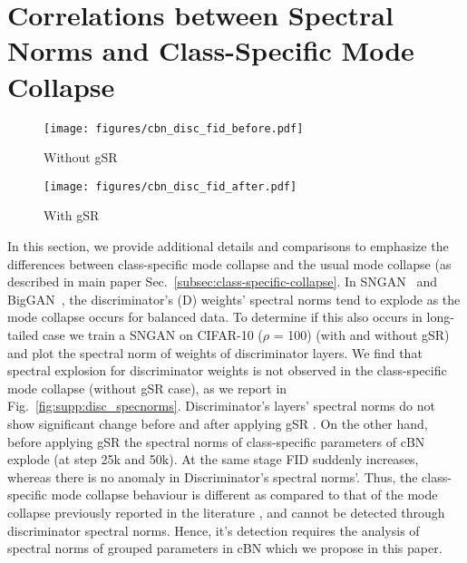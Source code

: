 \documentclass[runningheads,table]{llncs}
\begin{document}
\section{Correlations between Spectral Norms and Class-Specific Mode Collapse}
\label{sec:supp:corr}
\begin{figure*}[ht]
     \centering
     \begin{subfigure}[b]{\textwidth}
         \centering
         \texttt{[image: figures/cbn\_disc\_fid\_before.pdf]}
         \caption{Without gSR}
         \label{fig:supp:wo_gsr}
     \end{subfigure}
     \hfill
     \begin{subfigure}[b]{\textwidth}
         \centering
         \texttt{[image: figures/cbn\_disc\_fid\_after.pdf]}
         \caption{With gSR}
         \label{fig:supp:w_gsr}
     \end{subfigure}
     
    \caption{\textbf{Class-specific mode collapse exhibits unique behaviour with respect to cBN parameters.} Class-specific mode collapse leads to spectral explosion in Generator's cBN parameters' spectral norms (left), which correlates with explosion of FID (right), while having little effect on discriminator's parameters' spectral norms (middle). Class-specific mode collapse is remedied by gSR which keeps the cBN parameters' spectral norms under control.}
        \label{fig:supp:disc_specnorms}
        \vspace{-4mm}
\end{figure*}

In this section, we provide additional details and comparisons to emphasize the differences between class-specific mode collapse and the usual mode collapse (as described in main paper Sec.~\ref{subsec:class-specific-collapse}.
In SNGAN~\cite{miyato2018spectral} and  BigGAN~\cite{brock2018large}, the discriminator's (D) weights' spectral norms tend to explode as the mode collapse occurs for balanced data. To determine if this also occurs in long-tailed case we train a SNGAN on CIFAR-10 ($\rho$ = 100) (with and without gSR) and plot the spectral norm of weights of discriminator layers. We find that spectral explosion for discriminator weights is not observed in the class-specific mode collapse (without gSR case), as we report in Fig.~\ref{fig:supp:disc_specnorms}. Discriminator's layers' spectral norms do not show significant change before and after applying gSR . On the other hand, before applying gSR the spectral norms of class-specific parameters of cBN explode (at step 25k and 50k). At the same stage FID suddenly increases, whereas there is no anomaly in Discriminator's spectral norms'.  Thus, the class-specific mode collapse behaviour is different as compared to that of the mode collapse previously reported in the literature \cite{miyato2018cgans, brock2018large}, and cannot be detected through discriminator spectral norms. Hence, it's detection requires the analysis of spectral norms of grouped parameters in cBN  which we propose in this paper. 
 
\end{document}
